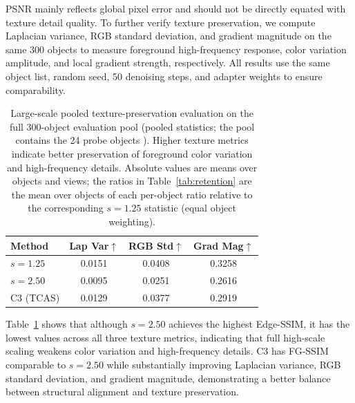 \documentclass[times,twocolumn,final]{elsarticle}
\providecommand{\DIFadd}[1]{{\protect\color{blue} \sf #1}} %
\providecommand{\DIFaddFL}[1]{\DIFadd{#1}} %
\providecommand{\DIFaddbeginFL}{} %
\providecommand{\DIFaddendFL}{} %
\newcommand{\DIFaddincludegraphics}[2][]{{\color{blue}\fbox{\DIFOincludegraphics[#1]{#2}}}} %
\DeclareRobustCommand{\DIFaddbeginFL}{\DIFOaddbeginFL \let\includegraphics\DIFaddincludegraphics} %
\DeclareRobustCommand{\DIFaddendFL}{\DIFOaddendFL \let\includegraphics\DIFOincludegraphics} %
\begin{document}
PSNR mainly reflects global pixel error and should not be directly equated with texture detail quality. To further verify texture preservation, we compute Laplacian variance, RGB standard deviation, and gradient magnitude on the same 300 objects to measure foreground high-frequency response, color variation amplitude, and local gradient strength, respectively. All results use the same object list, random seed, 50 denoising steps, and adapter weights to ensure comparability.


\begin{table}[t]
\centering
\caption{Large-scale   \DIFaddbeginFL \DIFaddFL{pooled texture-preservation evaluation }\DIFaddendFL on   \DIFaddbeginFL \DIFaddFL{the full 300-object evaluation pool (pooled statistics; the pool contains the 24 probe }\DIFaddendFL objects\DIFaddbeginFL \DIFaddFL{)}\DIFaddendFL . Higher texture metrics indicate better preservation of foreground color variation and high-frequency details. \DIFaddbeginFL \DIFaddFL{Absolute values are means over objects and views; the ratios in Table~\ref{tab:retention} are the mean over objects of each per-object ratio relative to the corresponding $s = 1.25$ statistic (equal object weighting).}\DIFaddendFL }
\label{tab:texture300}
\small
\begin{tabular}{lccc}
\toprule
Method & Lap Var$\uparrow$ & RGB Std$\uparrow$ & Grad Mag$\uparrow$ \\
\midrule
$s = 1.25$ & 0.0151 & 0.0408 & 0.3258 \\
$s = 2.50$ & 0.0095 & 0.0251 & 0.2616 \\
C3 (TCAS) & 0.0129 & 0.0377 & 0.2919 \\
\bottomrule
\end{tabular}
\end{table}

Table~\ref{tab:texture300} shows that although $s = 2.50$ achieves the highest Edge-SSIM, it has the lowest values across all three texture metrics, indicating that full high-scale scaling weakens color variation and high-frequency details. C3 has FG-SSIM comparable to $s = 2.50$ while substantially improving Laplacian variance, RGB standard deviation, and gradient magnitude, demonstrating a better balance between structural alignment and texture preservation.
\end{document}
